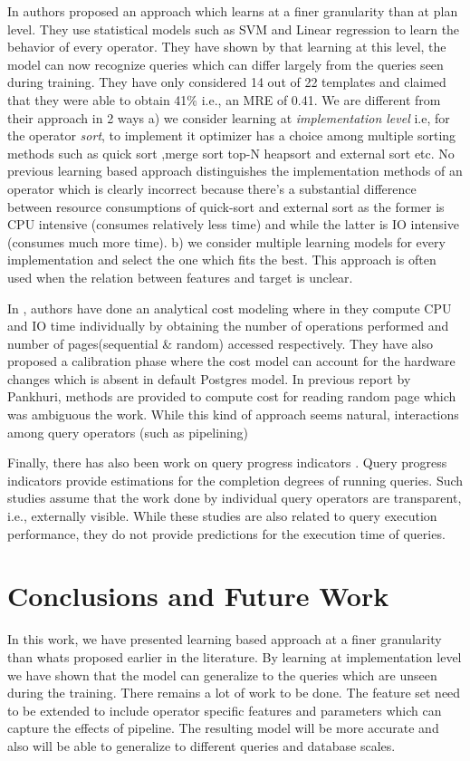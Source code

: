 \documentclass{article}
\begin{document}
\begin{multicols}{2}
	In \cite{ICDE2012, MSR} authors proposed an approach which learns at a finer granularity than 
	at plan level. They use statistical models such as SVM and Linear regression to learn the behavior of 
	every operator. They have shown by that learning at this level, the model can now recognize queries 		which can differ largely from the queries seen during training. They have only considered 14 out of 		22 templates and claimed that they were able to obtain 41\% i.e., an MRE of 0.41. We are different 			from their approach in 2 ways a) we consider learning at \textit{implementation level} i.e, for the operator \textit{sort}, to implement it optimizer has a choice among multiple sorting methods such as quick sort ,merge sort top-N heapsort and external sort etc. No previous learning based approach distinguishes the implementation methods of an operator which is clearly incorrect because there's a substantial difference between resource consumptions of quick-sort and external sort as the former is CPU intensive (consumes relatively less time) and while the latter is IO intensive (consumes much more time). b) we consider multiple learning models for every implementation and select the one which fits the best. This approach is often used when the relation between features and target is unclear. 
	
	In \cite{analytical}, authors have done an analytical cost modeling where in they compute CPU and IO time individually by obtaining the number of operations performed and number of pages(sequential \& random) accessed respectively. They have also proposed a calibration phase where the cost model can account for the hardware changes which is absent in default Postgres model. In previous report by Pankhuri, methods are provided to compute cost for reading random page which was ambiguous the work\cite{analytical}. While this kind of approach seems natural, interactions among query operators (such as pipelining) 
	
	Finally, there has also been work on query progress indicators \cite{progress}. Query progress indicators provide estimations for the completion degrees of running queries. Such studies assume that the work
	done by individual query operators are transparent, i.e., externally
	visible. While these studies are also related to query execution performance,
	they do not provide predictions for the execution time of
	queries.
	
	\section{Conclusions and Future Work}
	In this work, we have presented learning based approach at a finer granularity than whats proposed earlier in the literature. By learning at implementation level we have shown that the model can generalize to the queries which are unseen during the training.
	There remains a lot of work to be done. The feature set need to be extended to include operator specific features and parameters which can capture the effects of pipeline. The resulting model will be more accurate and also will be able to generalize to different queries and database scales.
	

\end{multicols}
\end{document}
